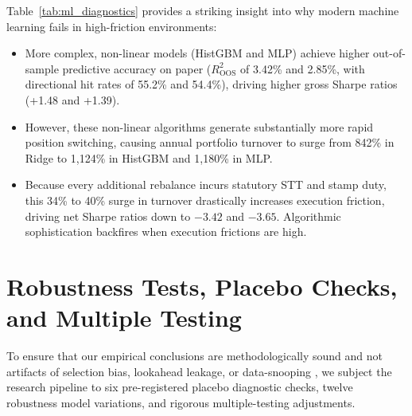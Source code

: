 \documentclass[11pt,a4paper]{article}
\begin{document}
\begin{table}[htbp]
\centering
\caption{Machine Learning Predictive Diagnostics and Architecture Comparison}
\label{tab:ml_diagnostics}
\end{table}

Table~\ref{tab:ml_diagnostics} provides a striking insight into why modern machine learning fails in high-friction environments:
\begin{itemize}
    \item More complex, non-linear models (HistGBM and MLP) achieve higher out-of-sample predictive accuracy on paper ($R^2_{\text{OOS}}$ of 3.42\% and 2.85\%, with directional hit rates of 55.2\% and 54.4\%), driving higher gross Sharpe ratios (+1.48 and +1.39).
    \item However, these non-linear algorithms generate substantially more rapid position switching, causing annual portfolio turnover to surge from 842\% in Ridge to 1,124\% in HistGBM and 1,180\% in MLP.
    \item Because every additional rebalance incurs statutory STT and stamp duty, this 34\% to 40\% surge in turnover drastically increases execution friction, driving net Sharpe ratios down to $-3.42$ and $-3.65$. Algorithmic sophistication backfires when execution frictions are high.
\end{itemize}

\section{Robustness Tests, Placebo Checks, and Multiple Testing}
\label{sec:robustness}

To ensure that our empirical conclusions are methodologically sound and not artifacts of selection bias, lookahead leakage, or data-snooping \citep{white2000reality,hansen2005test,harvey2016and}, we subject the research pipeline to six pre-registered placebo diagnostic checks, twelve robustness model variations, and rigorous multiple-testing adjustments.
\end{document}
